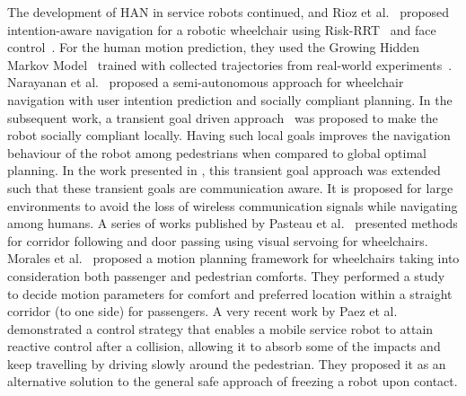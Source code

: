 The development of HAN in service robots continued, and Rioz et al.~\cite{rios2012intention} proposed intention-aware navigation for a robotic wheelchair using Risk-RRT~\cite{rios2011understanding} and face control~\cite{escobedo2012context}. For the human motion prediction, they used the Growing Hidden Markov Model~\cite{govea2010growing} trained with collected trajectories from real-world experiments~\cite{vasquez2013human}. Narayanan et al.~\cite{narayanan2016semi} proposed a semi-autonomous approach for wheelchair navigation with user intention prediction and socially compliant planning. In the subsequent work, a transient goal driven approach~\cite{narayanan2018formalizing} was proposed to make the robot socially compliant locally. Having such local goals improves the navigation behaviour of the robot among pedestrians when compared to global optimal planning. In the work presented in \cite{narayanan2018transient}, this transient goal approach was extended such that these transient goals are communication aware. It is proposed for large environments to avoid the loss of wireless communication signals while navigating among humans. A series of works published by Pasteau et al.~\cite{pasteau2016visual, pasteau2013corridor, pasteau2014vision} presented methods for corridor following and door passing using visual servoing for wheelchairs. Morales et al.~\cite{morales2017social} proposed a motion planning framework for wheelchairs taking into consideration both passenger and pedestrian comforts. They performed a study to decide motion parameters for comfort and preferred location within a straight corridor (to one side) for passengers. A very recent work by Paez et al.~\cite{paez2022unfreezing} demonstrated a control strategy that enables a mobile service robot to attain reactive control after a collision, allowing it to absorb some of the impacts and keep travelling by driving slowly around the pedestrian. They proposed it as an alternative solution to the general safe approach of freezing a robot upon contact.

